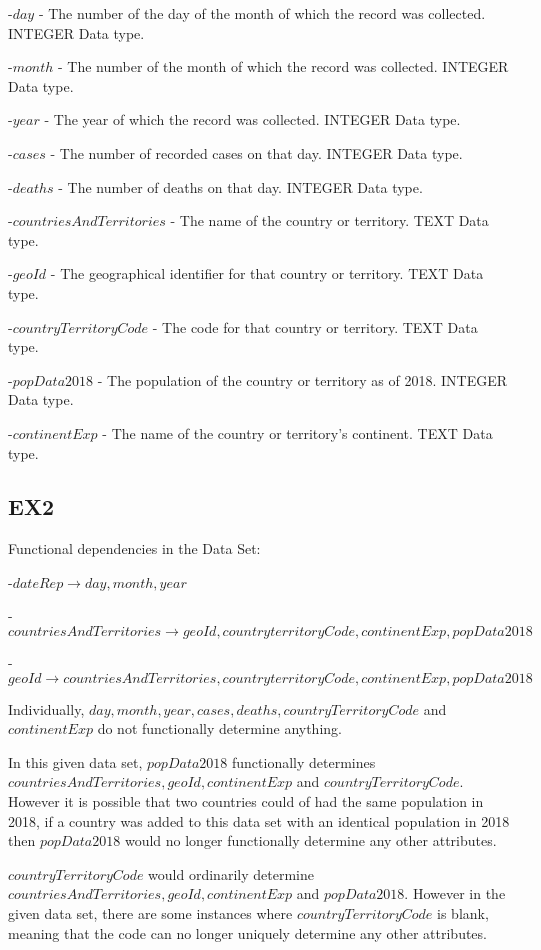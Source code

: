 \documentclass[12pt]{article}
\begin{document}
-$day$ - The number of the day of the month of which the record was collected. INTEGER Data type.

-$month$ - The number of the month of which the record was collected. INTEGER Data type.

-$year$ - The year of which the record was collected. INTEGER Data type.

-$cases$ - The number of recorded cases on that day. INTEGER Data type.

-$deaths$ - The number of deaths on that day. INTEGER Data type.

-$countriesAndTerritories$ - The name of the country or territory. TEXT Data type.

-$geoId$ - The geographical identifier for that country or territory. TEXT Data type.

-$countryTerritoryCode$ - The code for that country or territory. TEXT Data type.

-$popData2018$ - The population of the country or territory as of 2018. INTEGER Data type.

-$continentExp$ - The name of the country or territory's continent. TEXT Data type.

\subsection*{EX2}

Functional dependencies in the Data Set:

-$dateRep \rightarrow day, month, year$

-$countriesAndTerritories \rightarrow geoId, countryterritoryCode, continentExp, popData2018$

-$geoId \rightarrow countriesAndTerritories, countryterritoryCode, continentExp, popData2018$

\vspace{1em}

Individually, $day, month, year, cases, deaths, countryTerritoryCode$ and $continentExp$ do not functionally determine anything.

In this given data set, $popData2018$ functionally determines $countriesAndTerritories, geoId, continentExp$ and $countryTerritoryCode$. However it is possible that two countries could of had the same population in 2018, if a country was added to this data set with an identical population in 2018 then $popData2018$ would no longer functionally determine any other attributes.

$countryTerritoryCode$ would ordinarily determine $countriesAndTerritories, geoId, continentExp$ and $popData2018$. However in the given data set, there are some instances where $countryTerritoryCode$ is blank, meaning that the code can no longer uniquely determine any other attributes.
\end{document}
